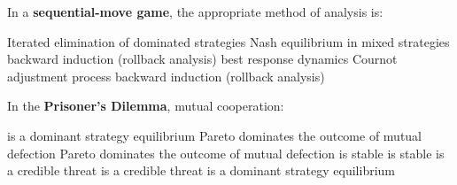 \begin{question}
  In a \textbf{sequential-move game}, the appropriate method of analysis is:
  \begin{tasks}
    \task \vary
    {Iterated elimination of dominated strategies}
    {Nash equilibrium in mixed strategies}
    \task \vary
    {\correct backward induction (rollback analysis)}
    {best response dynamics}
    \task \vary
    {Cournot adjustment process}
    {\correct backward induction (rollback analysis)}
  \end{tasks}
\end{question}

\begin{question}
  In the \textbf{Prisoner’s Dilemma}, mutual cooperation:
  \begin{tasks}
    \task \vary
    {is a dominant strategy equilibrium}
    {\correct Pareto dominates the outcome of mutual defection}
    \task \vary
    {\correct Pareto dominates the outcome of mutual defection}
    {is stable}
    \task \vary
    {is stable}
    {is a credible threat}
    \task \vary
    {is a credible threat}
    {is a dominant strategy equilibrium}
  \end{tasks}
\end{question}